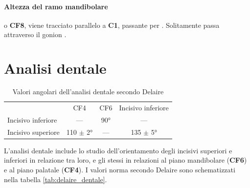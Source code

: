\paragraph{Altezza del ramo mandibolare} o \textbf{CF8}, viene tracciato parallelo a \textbf{C1}, passante per . Solitamente passa attraverso il gonion .

\section{Analisi dentale}
\begin{table}[!ht]
\centering
\caption{Valori angolari dell'analisi dentale secondo Delaire}
\label{tab:delaire_dentale}
\begin{tabular}{lccc}
\toprule
 & CF4 & CF6 & Incisivo inferiore \\
\cmidrule(r){2-4}
Incisivo inferiore & --- & 90° & --- \\
Incisivo superiore & 110 $\pm$ 2° & --- & 135 $\pm$ 5° \\
\bottomrule
\end{tabular}
\end{table}

L'analisi dentale include lo studio dell'orientamento degli incisivi superiori e inferiori in relazione tra loro, e gli stessi in relazioni al piano mandibolare (\textbf{CF6}) e al piano palatale (\textbf{CF4}). I valori norma secondo Delaire sono schematizzati nella tabella \vref{tab:delaire_dentale}.